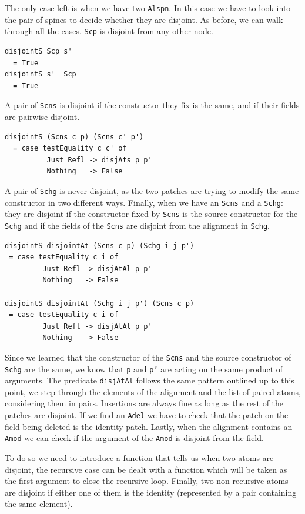 \documentclass[11pt, titlepage]{article}
\newcommand{\toHaskell}[1]{\texttt{#1}\xspace}
\newcommand{\alspn}{\toHaskell{Alspn}}
\newcommand{\scp}{\toHaskell{Scp}}
\newcommand{\scns}{\toHaskell{Scns}}
\newcommand{\schg}{\toHaskell{Schg}}
\newcommand{\adel}{\toHaskell{Adel}}
\newcommand{\amod}{\toHaskell{Amod}}
\begin{document}
The only case left is when we have two \alspn. In this case we have to look into the pair of spines to decide whether they are disjoint. 
As before, we can walk through all the cases.
\scp is disjoint from any other node. 

\begin{verbatim}
disjointS Scp s'
  = True
disjointS s'  Scp
  = True
\end{verbatim}

A pair of \scns is disjoint if the constructor they fix is the same, and if their 
fields are pairwise disjoint.

\begin{verbatim}
disjointS (Scns c p) (Scns c' p')
  = case testEquality c c' of
          Just Refl -> disjAts p p'
          Nothing   -> False
\end{verbatim}                   

A pair of \schg is never disjoint, as the two patches are trying to modify the same constructor in two different ways.
Finally, when we have an \scns and a \schg: they are disjoint if the constructor fixed by \scns is the source constructor for the \schg and if the fields of the \scns are disjoint from the alignment in \schg. 

\begin{verbatim}
disjointS disjointAt (Scns c p) (Schg i j p')
 = case testEquality c i of
         Just Refl -> disjAtAl p p'
         Nothing   -> False

disjointS disjointAt (Schg i j p') (Scns c p)
 = case testEquality c i of
         Just Refl -> disjAtAl p p'
         Nothing   -> False
\end{verbatim}

Since we learned that the constructor of the \scns and the source constructor of \schg are the same, we know that \toHaskell{p} and \toHaskell{p'} are acting on the same product of arguments. The predicate \toHaskell{disjAtAl} follows the same pattern outlined up to this point, we step through the elements of the alignment and the list of paired atoms, considering them in pairs. 
Insertions are always fine as long as the rest of the patches are disjoint.
If we find an \adel we have to check that the patch on the field being deleted is the identity patch.
Lastly, when the alignment contains an \amod we can check if the argument of the \amod is disjoint from the field.

To do so we need to introduce a function that tells us when two atoms are disjoint, the recursive case can be dealt with a function which will be taken as the first argument to close the recursive loop.
Finally, two non-recursive atoms are disjoint if either one of them is the identity (represented by a pair containing the same element).
\end{document}
